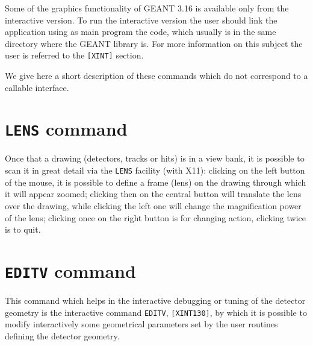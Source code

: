    
   

Some of the graphics functionality of GEANT 3.16 is available only
from the interactive version. To run the interactive version the user
should link the application using as main program the 
code, which usually is in the same directory where the GEANT library
is. For more information on this subject the user is referred to the 
{\tt [XINT]} section.

We give here a short description of these commands which do not
correspond to a callable interface.

\section{{\tt LENS} command}
Once that a drawing (detectors, tracks or hits) is in a view bank, it is 
possible to scan it in great detail via the {\tt LENS} facility (with X11):
clicking on the left button of the mouse, it is possible to define a frame
(lens) on the drawing through which it will appear zoomed; clicking then on
the central button will translate the lens over the drawing, while clicking
the left one will change the magnification power of the lens; clicking once
on the right button is for changing action, clicking twice is to quit.

\section{{\tt EDITV} command}
This command which helps in the interactive debugging or tuning of the 
detector geometry is the interactive command {\tt EDITV}, {\tt [XINT130]},
by which it is possible to modify interactively some geometrical parameters
set by the user routines defining the detector geometry.

